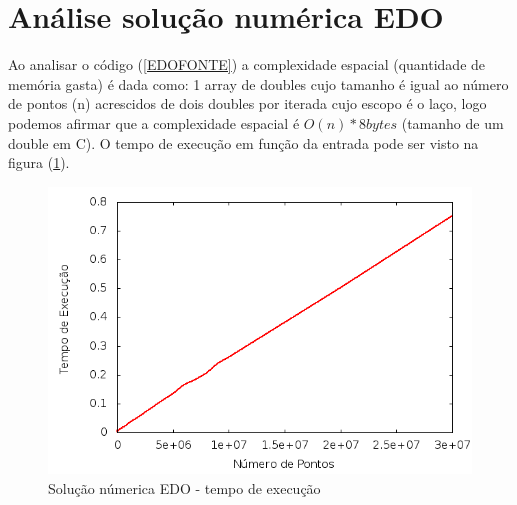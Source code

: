 \section{Análise solução numérica EDO}
Ao analisar o código (\ref{EDOFONTE}) a complexidade espacial (quantidade de memória gasta) é dada como: 1 array de doubles cujo tamanho é igual ao número de pontos (n) acrescidos de dois doubles por iterada cujo escopo é o laço, logo podemos afirmar que a complexidade espacial é $O(n) * 8bytes$ (tamanho de um double em C). O tempo de execução em função da entrada pode ser visto na figura (\ref{tmpExecEuler}).
\begin{figure}[!htb]
\centering
\begin{minipage}[b]{0.45\linewidth}
\includegraphics[width=\linewidth]{./img/AspectosNumericos/EulerComplexidade.png}
\caption{Solução númerica EDO - tempo de execução}
\label{tmpExecEuler}
\end{minipage} \hfill
\end{figure}

